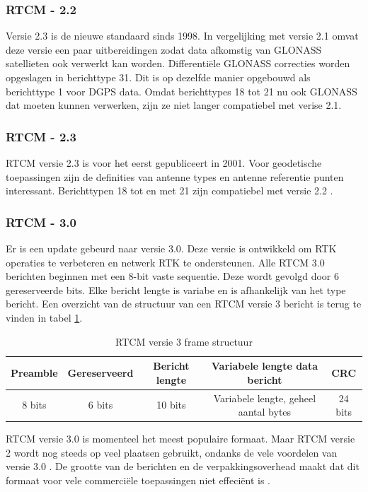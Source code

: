 \subsubsection{RTCM - 2.2}
Versie 2.3 is de nieuwe standaard sinds 1998. In vergelijking met versie 2.1 omvat deze versie een paar uitbereidingen zodat data afkomstig van GLONASS satellieten ook verwerkt kan worden. Differenti\"ele GLONASS correcties worden opgeslagen in berichttype 31. Dit is op dezelfde manier opgebouwd als berichttype 1 voor DGPS data. Omdat berichttypes 18 tot 21 nu ook GLONASS dat moeten kunnen verwerken, zijn ze niet langer compatiebel met verise 2.1. 

\subsubsection{RTCM - 2.3}
RTCM versie 2.3 is voor het eerst gepubliceert in 2001.  Voor geodetische toepassingen zijn de definities van antenne types en antenne referentie punten interessant. Berichttypen 18 tot en met 21 zijn compatiebel met versie 2.2 \cite{LBibRTCM3}. 

\subsubsection{RTCM - 3.0}
 Er is een update gebeurd naar versie 3.0. Deze versie is ontwikkeld om RTK operaties te verbeteren en netwerk RTK te ondersteunen. Alle RTCM 3.0 berichten beginnen met een 8-bit vaste sequentie. Deze wordt gevolgd door 6 gereserveerde bits. Elke bericht lengte is variabe en is afhankelijk van het type bericht. Een overzicht van de structuur van een RTCM versie 3 bericht is terug te vinden in tabel \ref{TabRTCM}.

\begin{table}[hbp]
	\caption{RTCM versie 3 frame structuur}		
	\begin{tabular}{|c|c|c|c|c|}	
		\hline
		Preamble & Gereserveerd & Bericht lengte & Variabele lengte data bericht & CRC \\ \hline
		8 bits & 6 bits & 10 bits & Variabele lengte, geheel aantal bytes & 24 bits \\ \hline
	\end{tabular}
	\label{TabRTCM}
\end{table}
RTCM versie 3.0 is momenteel het meest populaire formaat. Maar RTCM versie 2 wordt nog steeds op veel plaatsen gebruikt, ondanks de vele voordelen van versie 3.0 \cite{LBibRTCM}. De grootte van de berichten en de verpakkingsoverhead maakt dat dit formaat voor vele commerci\"ele toepassingen niet effeci\"ent is \cite{LBibDGPS}.  


